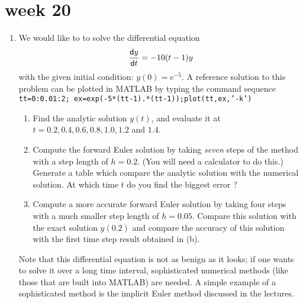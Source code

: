 \documentclass[11pt,a4paper]{article}
\newcommand{\dif}{\mathsf{d}}
\begin{document}
\begin{enumerate}
%

\end{enumerate}
\vfill\eject

\section*{week 20}

 
\begin{enumerate}
 \item \label{qdjsode1}
 We would like to  to solve the differential equation
$$
{\dif y\over \dif t} = -10(t-1)y
$$
with the given  initial condition:
$y(0)=e^{-5}$. 
{A reference  solution to this problem can  be
plotted in MATLAB  by  typing the command sequence}  \\[1ex]
{\tt tt=0:0.01:2; ex=exp(-5*(tt-1).*(tt-1));plot(tt,ex,'-k')}

\begin{enumerate}
\item 
Find the analytic solution $y(t)$, and evaluate it at\\
$t=0.2,0.4, 0.6, 0.8, 1.0, 1.2$ and  $1.4$.


\item
Compute the forward Euler solution by  taking {\it seven} steps of the method
with a step length of $h=0.2$. (You will need a calculator to do this.)
Generate a table which
compare the analytic solution with the numerical solution. At which
time $t$ do you find the biggest error ?

\item
Compute a more accurate  forward Euler solution  by  taking  four steps with
a  much smaller step length of $h=0.05$. Compare this solution
with the exact solution  $y(0.2)$ and compare the accuracy of this  solution
with the first time step result  obtained in (b).
\end{enumerate}

Note that  this differential equation  is not as benign as
it looks; if one wants to solve it over a long time interval,
sophisticated numerical methods (like those that are built into MATLAB)
 are needed. A simple example of a sophisticated method is
 the implicit Euler method discussed in the lectures. 
\end{enumerate}
\end{document}
